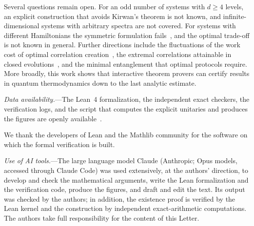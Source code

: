\documentclass[aps,prl,reprint,superscriptaddress,amsmath,amssymb]{revtex4-2}
\begin{document}
Several questions remain open. For an odd number of systems with $d\ge4$ levels, an explicit construction that avoids
Kirwan's theorem is not known, and infinite-dimensional systems with arbitrary spectra are not covered. For systems with different Hamiltonians the symmetric formulation fails~\cite{Bakhshinezhad2019},
and the optimal trade-off is not known in general. Further directions include the fluctuations of the work cost of
optimal correlation creation~\cite{McKay2018}, the extremal correlations attainable in closed
evolutions~\cite{Jevtic2012}, and the minimal entanglement that optimal protocols require. More broadly, this work
shows that interactive theorem provers can certify results in quantum thermodynamics down to the last analytic
estimate.

\textit{Data availability.}---The Lean~4 formalization, the independent exact checkers, the verification logs, and
the script that computes the explicit unitaries and produces the figures are openly available~\cite{repo}.

\begin{acknowledgments}
We thank the developers of Lean and the Mathlib community for the software on which the formal verification is
built.

\textit{Use of AI tools.}---The large language model Claude (Anthropic; Opus models, accessed through Claude Code)
was used extensively, at the authors' direction, to develop and check the mathematical arguments, write the Lean
formalization and the verification code, produce the figures, and draft and edit the text. Its output was checked
by the authors; in addition, the existence proof is verified by the Lean kernel and the construction by independent
exact-arithmetic computations. The authors take full responsibility for the content of this Letter.
\end{acknowledgments}


\end{document}
